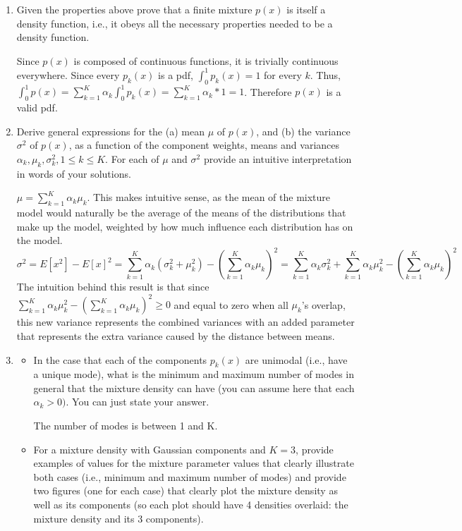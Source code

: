 \documentclass[11pt]{article}
\begin{document}
 \begin{enumerate}
\item Given the properties above prove that a finite mixture $p(x)$ is itself a density function, i.e., it obeys all the necessary properties needed to be a density function. 

Since $p(x)$ is composed of continuous functions, it is trivially continuous everywhere. 
Since every $p_k(x)$ is a pdf, $\int_0^1 p_k(x) = 1$ for every $k$. 
Thus, $\int_0^1 p(x) = \sum_{k=1}^K \alpha_k \int_0^1 p_k(x) = \sum_{k=1}^K \alpha_k * 1 = 1$.
Therefore $p(x)$ is a valid pdf.

\item Derive general expressions for the (a) mean $\mu$ of $p(x)$, and
(b) the variance $\sigma^2$ of $p(x)$, as a function of the
component weights, means and variances $\alpha_k, \mu_k, \sigma_k^2, 1 \le k \le K$. For
each of $\mu$  and $\sigma^2$ provide an intuitive interpretation in words of your solutions.

$\mu = \sum_{k=1}^K \alpha_k \mu_k$. This makes intuitive sense, as the mean of the mixture model 
would naturally be the average of the means of the distributions that make up the model, weighted 
by how much influence each distribution has on the model.
\begin{equation}
\sigma^2 = E[x^2] - E[x]^2 = 
\sum_{k=1}^K \alpha_k (\sigma_k^2 + \mu_k^2) - (\sum_{k=1}^K \alpha_k \mu_k)^2 = 
\sum_{k=1}^K \alpha_k \sigma_k^2 + \sum_{k=1}^K \alpha_k \mu_k^2 - (\sum_{k=1}^K \alpha_k \mu_k)^2
\end{equation}
The intuition behind this result is that since $\sum_{k=1}^K \alpha_k \mu_k^2 - (\sum_{k=1}^K \alpha_k \mu_k)^2 \geq 0$ and equal to zero when all $\mu_k$'s overlap, this new variance represents the combined variances with an added parameter that represents the extra variance caused by the distance between means.

\item 
\begin{itemize}
\item In the case that each of the components  $p_k(x)$ are unimodal (i.e., have a unique mode), what is the minimum and maximum number of modes in general that the mixture density can have (you can assume here that each $\alpha_k > 0)$. You can just state your answer.

The number of modes is between 1 and K.

\item For a mixture density with Gaussian components and $K=3$, provide  examples of values for the mixture parameter values that clearly illustrate both cases (i.e., minimum and maximum number of modes) and provide two figures (one for each case) that clearly plot the mixture density as well as its components (so each plot should have 4 densities overlaid: the mixture density and its 3 components).


\end{itemize}
\end{enumerate}
\end{document}
